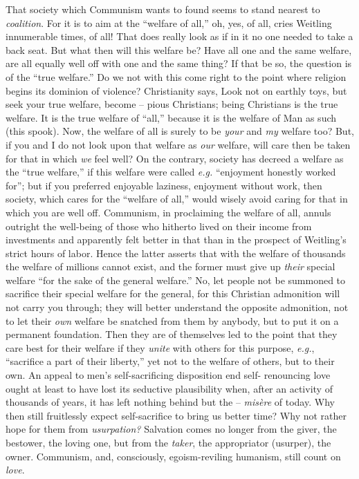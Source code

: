 That society which Communism wants to found seems to stand nearest to 
\textit{coalition}. For it is to aim at the ``welfare of all,'' oh, yes, of 
all, cries Weitling innumerable times, of all! That does really look as if in 
it no one needed to take a back seat. But what then will this welfare be? Have 
all one and the same welfare, are all equally well off with one and the same 
thing? If that be so, the question is of the ``true welfare.'' Do we not 
with this come right to the point where religion begins its dominion of 
violence? Christianity says, Look not on earthly toys, but seek your true 
welfare, become -- pious Christians; being Christians is the true welfare. It 
is the true welfare of ``all,'' because it is the welfare of Man as such 
(this spook). Now, the welfare of all is surely to be \textit{your} and 
\textit{my} welfare too? But, if you and I do not look upon that welfare as 
\textit{our} welfare, will care then be taken for that in which \textit{we} 
feel well? On the contrary, society has decreed a welfare as the ``true 
welfare,'' if this welfare were called \textit{e.g.} ``enjoyment honestly 
worked for''; but if you preferred enjoyable laziness, enjoyment without 
work, then society, which cares for the ``welfare of all,'' would wisely 
avoid caring for that in which you are well off. Communism, in proclaiming the 
welfare of all, annuls outright the well-being of those who hitherto lived on 
their income from investments and apparently felt better in that than in the 
prospect of Weitling's strict hours of labor. Hence the latter asserts that 
with the welfare of thousands the welfare of millions cannot exist, and the 
former must give up \textit{their} special welfare ``for the sake of the 
general welfare.'' No, let people not be summoned to sacrifice their special 
welfare for the general, for this Christian admonition will not carry you 
through; they will better understand the opposite admonition, not to let their 
\textit{own} welfare be snatched from them by anybody, but to put it on a 
permanent foundation. Then they are of themselves led to the point that they 
care best for their welfare if they \textit{unite} with others for this 
purpose, \textit{e.g.}, ``sacrifice a part of their liberty,'' yet not to 
the welfare of others, but to their own. An appeal to men's self-sacrificing 
disposition end self- renouncing love ought at least to have lost its 
seductive plausibility when, after an activity of thousands of years, it has 
left nothing behind but the -- \textit{mis\`ere} of today. Why then still 
fruitlessly expect self-sacrifice to bring us better time? Why not rather hope 
for them from \textit{usurpation?} Salvation comes no longer from the giver, 
the bestower, the loving one, but from the \textit{taker}, the appropriator 
(usurper), the owner. Communism, and, consciously, egoism-reviling humanism, 
still count on \textit{love}.

